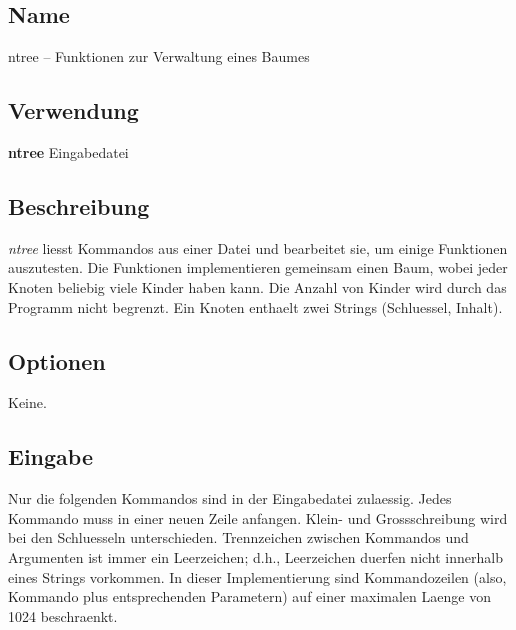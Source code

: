 
\subsection*{Name}

ntree -- Funktionen zur Verwaltung eines Baumes

\subsection*{Verwendung}

{\bf ntree} Eingabedatei

\subsection*{Beschreibung}

{\it ntree} liesst Kommandos aus einer Datei und bearbeitet sie, um
einige Funktionen auszutesten.
Die Funktionen implementieren gemeinsam einen Baum, wobei
jeder Knoten beliebig viele Kinder haben kann.  
Die Anzahl von Kinder wird durch das Programm nicht begrenzt. 
Ein Knoten enthaelt zwei Strings (Schluessel, Inhalt). 

\subsection*{Optionen}

Keine.

\subsection*{Eingabe}

Nur die folgenden Kommandos sind in der Eingabedatei zulaessig.
Jedes Kommando muss in einer neuen Zeile anfangen.
Klein- und Grossschreibung wird bei den Schluesseln unterschieden.
Trennzeichen zwischen Kommandos und Argumenten ist immer ein
Leerzeichen; d.h., Leerzeichen duerfen nicht innerhalb eines
Strings vorkommen.
In dieser Implementierung sind Kommandozeilen (also, Kommando plus
entsprechenden Parametern) auf einer maximalen Laenge von 1024
beschraenkt. 

